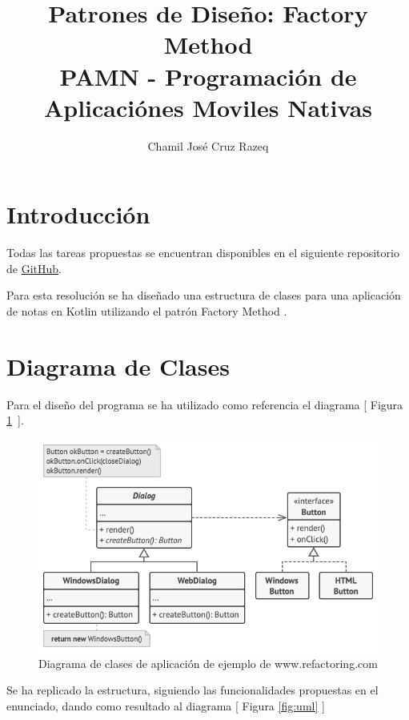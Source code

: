 \documentclass{article}
\title{Patrones de Diseño: Factory Method \\[3ex] \small PAMN - Programación de Aplicaciónes Moviles Nativas}
\author{Chamil José Cruz Razeq}
\begin{document}
    \maketitle
    \thispagestyle{empty}
    \newpage

    \section{Introducción}
        Todas las tareas propuestas se encuentran disponibles en el siguiente
         repositorio de \href{https://github.com/chamilstudy/ulpgc_pamn_assigments}{GitHub}.

        Para esta resolución se ha diseñado una estructura de clases para una
         aplicación de notas en Kotlin utilizando el patrón Factory Method \cite{FactoryMethod}.

        \section{Diagrama de Clases}

        Para el diseño del programa se ha utilizado como referencia el diagrama [ Figura \ref{fig:example} ].

        \begin{figure}[H]
            \centerline{\includegraphics[scale=0.3]{example.png}}
            \caption{Diagrama de clases de aplicación de ejemplo de www.refactoring.com \cite{FactoryMethod}}
            \label{fig:example}
        \end{figure}

        Se ha replicado la estructura, siguiendo las funcionalidades propuestas en el enunciado,
         dando como resultado al diagrama [ Figura \ref{fig:uml} ]
\end{document}
